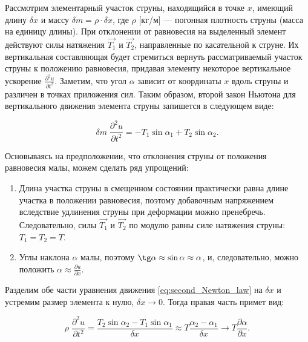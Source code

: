 \documentclass[12pt,a4paper,russian]{report}
\begin{document}
	
	Рассмотрим элементарный участок струны, находящийся в точке $x$, имеющий длину $\delta x$ и массу $\delta m = \rho \cdot \delta x$, где $\rho$ [кг/м] — погонная плотность струны (масса на единицу длины). При отклонении от равновесия на выделенный элемент действуют силы натяжения $\overrightarrow{T_1}$ и $\overrightarrow{T_2}$, направленные по касательной к струне. Их вертикальная составляющая будет стремиться вернуть рассматриваемый участок струны к положению равновесия, придавая элементу некоторое вертикальное ускорение $\frac{\partial^2 u}{\partial t^2}$. Заметим, что угол $\alpha$ зависит от координаты $x$ вдоль струны и различен в точках приложения сил. Таким образом, второй закон Ньютона для вертикального движения элемента струны запишется в следующем виде:
	
	\begin{equation} \label{eq:second_Newton_law}
		\delta m \; \frac{\partial^2 u}{\partial t^2} = - T_1 \sin \alpha_1 + T_2 \sin \alpha_2.
	\end{equation}
	
	Основываясь на предположении, что отклонения струны от положения равновесия малы, можем сделать ряд упрощений:
	
	\begin{enumerate}
		\item Длина участка струны в смещенном состоянии практически равна длине участка в положении равновесия, поэтому добавочным напряжением вследствие удлинения струны при деформации можно пренебречь. Следовательно, силы $\overrightarrow{T_1}$ и $\overrightarrow{T_2}$ по модулю равны силе натяжения струны: $T_1 = T_2 = T$.
		
		\item Углы наклона $\alpha$ малы, поэтому $\tg \alpha \approx \sin \alpha \approx \alpha$, и, следовательно, можно положить $\alpha \approx \frac{\partial u}{\partial x}$.
	\end{enumerate}
	
	Разделим обе части уравнения движения \eqref{eq:second_Newton_law} на $\delta x$ и устремим размер элемента к нулю, $\delta x \rightarrow 0$. Тогда правая часть примет вид:
	
	\begin{equation}  \label{eq:second_Newton_law_approx}
		\rho \; \frac{\partial^2 u}{\partial t^2} = \frac{T_2 \sin \alpha_2 - T_1 \sin \alpha_1}{\delta x} \approx T \frac{\alpha_2 - \alpha_1}{\delta x} \rightarrow T \frac{\partial \alpha}{\partial x}.
	\end{equation}
	
\end{document}
